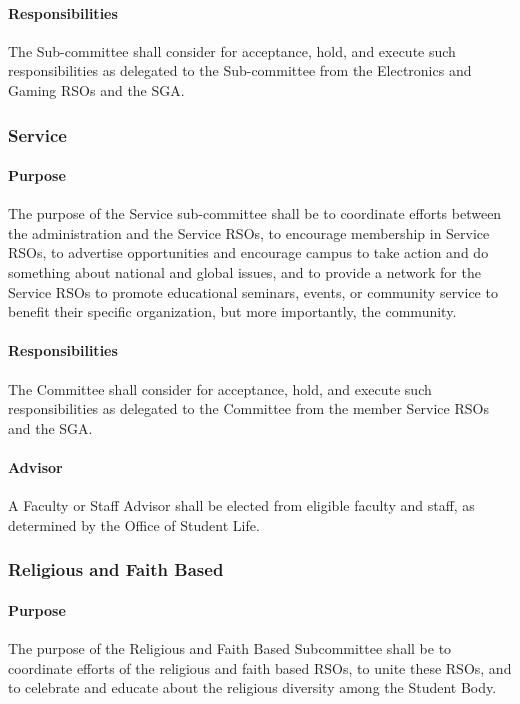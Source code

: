 \documentclass[12pt]{scrreprt}
\begin{document}
\paragraph{Responsibilities}
The Sub-committee shall consider for acceptance, hold, and execute such responsibilities as delegated to the Sub-committee from the Electronics and Gaming RSOs and the SGA.

\subsubsection{Service}

\paragraph{Purpose}
The purpose of the Service sub-committee shall be to coordinate
efforts between the administration and the Service RSOs, to encourage
membership in Service RSOs, to advertise opportunities and encourage
campus to take action and do something about national and global
issues, and to provide a network for the Service RSOs to promote
educational seminars, events, or community service to benefit their
specific organization, but more importantly, the community.

\paragraph{Responsibilities}
The Committee shall consider for acceptance, hold, and execute such
responsibilities as delegated to the Committee from the member Service
RSOs and the SGA.

\paragraph{Advisor}
A Faculty or Staff Advisor shall be elected from eligible faculty and
staff, as determined by the Office of Student Life.

\subsubsection{Religious and Faith Based}

\paragraph{Purpose}
​The purpose of the Religious and Faith Based Subcommittee shall be to coordinate efforts of the religious and faith based RSOs, to unite these RSOs, and to celebrate and educate about the religious diversity among the Student Body.
\end{document}

